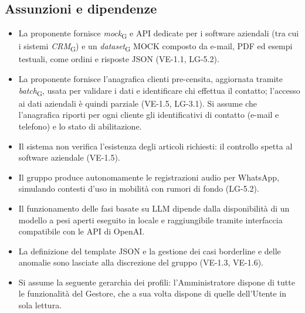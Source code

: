 \subsection{Assunzioni e dipendenze}
	\begin{itemize}
		\item La proponente fornisce \textit{mock}\textsubscript{G} e API dedicate per i software aziendali (tra cui i sistemi \textit{CRM}\textsubscript{G}) e un \textit{dataset}\textsubscript{G} MOCK composto da e-mail, PDF ed esempi testuali, come ordini e risposte JSON (VE-1.1, LG-5.2).
		\item La proponente fornisce l'anagrafica clienti pre-censita, aggiornata tramite \textit{batch}\textsubscript{G}, usata per validare i dati e identificare chi effettua il contatto; l'accesso ai dati aziendali è quindi parziale (VE-1.5, LG-3.1). Si assume che l'anagrafica riporti per ogni cliente gli identificativi di contatto (e-mail e telefono) e lo stato di abilitazione.
		\item Il sistema non verifica l'esistenza degli articoli richiesti: il controllo spetta al software aziendale (VE-1.5).
		\item Il gruppo produce autonomamente le registrazioni audio per WhatsApp, simulando contesti d'uso in mobilità con rumori di fondo (LG-5.2).
		\item Il funzionamento delle fasi basate su LLM dipende dalla disponibilità di un modello a pesi aperti eseguito in locale e raggiungibile tramite interfaccia compatibile con le API di OpenAI.
		\item La definizione del template JSON e la gestione dei casi borderline e delle anomalie sono lasciate alla discrezione del gruppo (VE-1.3, VE-1.6).
		\item Si assume la seguente gerarchia dei profili: l'Amministratore dispone di tutte le funzionalità del Gestore, che a sua volta dispone di quelle dell'Utente in sola lettura.
	\end{itemize}